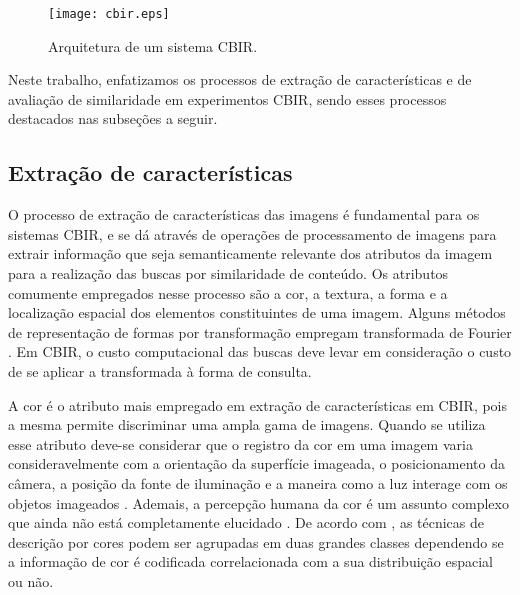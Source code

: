 \begin{figure} 
\centering
\caption{\label{fig:cbir} Arquitetura de um sistema \ac{CBIR}.}
\texttt{[image: cbir.eps]}
\end{figure}
 
Neste trabalho, enfatizamos os processos de extração de características e de avaliação de similaridade em experimentos \ac{CBIR}, sendo esses processos destacados nas subseções a seguir.

\subsection{Extração de características}

O processo de extração de características das imagens é fundamental para os sistemas \ac{CBIR}, e se dá através de operações de processamento de imagens para extrair informação que seja semanticamente relevante dos atributos da imagem para a realização das buscas por similaridade de conteúdo. Os atributos comumente empregados nesse processo são a cor, a textura, a forma e a localização espacial dos elementos constituintes de uma imagem. Alguns métodos de representação de formas por transformação empregam transformada de Fourier \cite{Costa:1997,ShuPanWu2015}. Em \ac{CBIR}, o custo computacional das buscas deve levar em consideração o custo de se aplicar a transformada à forma de consulta. 

A cor é o atributo mais empregado em extração de características em \ac{CBIR}, pois a mesma permite discriminar uma ampla gama de imagens. Quando se utiliza esse atributo deve-se considerar que o registro da cor em uma imagem varia consideravelmente com a orientação da superfície imageada, o posicionamento da câmera, a posição da fonte de iluminação e a maneira como a luz interage com os objetos imageados \cite{Smeulders:2000}. Ademais, a percepção humana da cor é um assunto complexo que ainda não está completamente elucidado \cite{Smeulders:2000}. De acordo com , as técnicas de descrição por cores podem ser agrupadas em duas grandes classes dependendo se a informação de cor é codificada correlacionada com a sua distribuição espacial ou não. 

\begin{comment}Esses mesmos autores exemplificam como técnicas que não levam em consideração a distribuição espacial das cores os histogramas e os momentos de cores. 
\end{comment}

